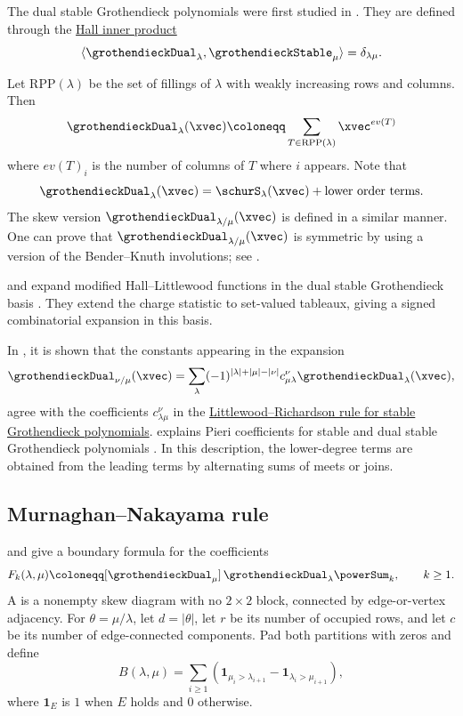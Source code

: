 The dual stable Grothendieck polynomials were first studied in \cite{LamPylyavskyy2007combinatorialhopf}.
They are defined through the \hyperref[hallInnerProduct]{Hall inner product}
\[
\langle \grothendieckDual_\lambda, \grothendieckStable_\mu \rangle = \delta_{\lambda \mu}.
\]

Let $\mathrm{RPP}(\lambda)$ be the set of fillings of $\lambda$ with weakly increasing rows and columns.
Then
\[
\grothendieckDual_\lambda(\xvec) \coloneqq \sum_{T \in \mathrm{RPP}(\lambda)} \xvec^{ev(T)}
\]
where $ev(T)_i$ is the number of columns of $T$ where $i$ appears.
Note that
\[
\grothendieckDual_\lambda(\xvec) = \schurS_\lambda(\xvec) + \text{lower order terms}.
\]
The skew version $\grothendieckDual_{\lambda/\mu}(\xvec)$ is defined in a similar manner.
One can prove that $\grothendieckDual_{\lambda/\mu}(\xvec)$ is symmetric by
using a version of the Bender--Knuth involutions; see
\cite{GalashinGrinbergLiu2016}.

 and  expand modified
Hall--Littlewood functions in the dual stable Grothendieck basis
\cite{BandlowMorse2010}.  They extend the charge statistic to set-valued
tableaux, giving a signed combinatorial expansion in this basis.


In \cite{LiMorseShields2016}, it is shown that the constants appearing in the expansion
\[
\grothendieckDual_{\nu/\mu}(\xvec) = \sum_{\lambda}
(-1)^{|\lambda|+|\mu|-|\nu|} c^{\nu}_{\mu\lambda} \grothendieckDual_{\lambda}(\xvec),
\]
agree with the coefficients $c_{\lambda\mu}^{\nu}$ in
the \hyperref[grothendieckStableLittlewoodRichardson]{Littlewood--Richardson rule for stable Grothendieck polynomials}.
 explains Pieri coefficients for stable and dual
stable Grothendieck polynomials \cite{Takigiku2018x}.  In this description,
the lower-degree terms are obtained from the leading terms by alternating
sums of meets or joins.


\subsection[grothendieckDualStableMN]{Murnaghan--Nakayama rule}

 and  give a boundary formula
for the coefficients
\[
 F_k(\lambda,\mu)
 \coloneqq[\grothendieckDual_\mu]\,
       \grothendieckDual_\lambda\powerSum_k,\qquad k\geq1.
\]
A  is a nonempty skew diagram
with no $2\times2$ block, connected by edge-or-vertex adjacency.
For $\theta=\mu/\lambda$, let $d=|\theta|$, let $r$ be its number of
occupied rows, and let $c$ be its number of edge-connected components.
Pad both partitions with zeros and define
\[
 B(\lambda,\mu)=\sum_{i\geq1}
 \left(\mathbf{1}_{\mu_i>\lambda_{i+1}}
       -\mathbf{1}_{\lambda_i>\mu_{i+1}}\right),
\]
where $\mathbf{1}_E$ is $1$ when $E$ holds and $0$ otherwise.

